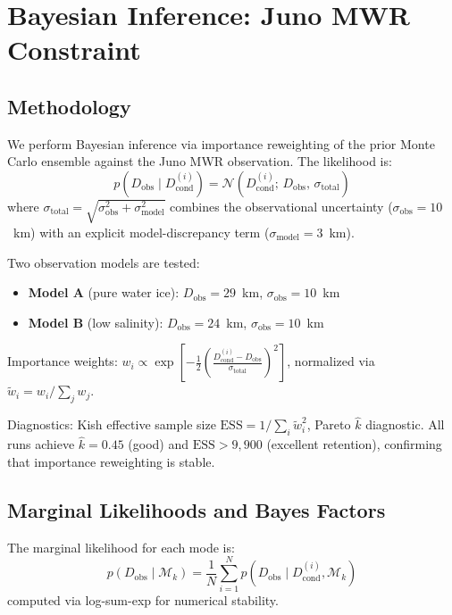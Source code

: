 \documentclass[11pt,letterpaper]{article}
\begin{document}
\section{Bayesian Inference: Juno MWR Constraint}
\label{sec:bayesian}

\subsection{Methodology}

We perform Bayesian inference via importance reweighting of the prior Monte Carlo ensemble against the Juno MWR observation. The likelihood is:
\begin{equation}
  p(D_\mathrm{obs} \mid D_\mathrm{cond}^{(i)}) = \mathcal{N}\!\left(D_\mathrm{cond}^{(i)};\, D_\mathrm{obs},\, \sigma_\mathrm{total}\right)
  \label{eq:likelihood}
\end{equation}
where $\sigma_\mathrm{total} = \sqrt{\sigma_\mathrm{obs}^2 + \sigma_\mathrm{model}^2}$ combines the observational uncertainty ($\sigma_\mathrm{obs} = 10$~km) with an explicit model-discrepancy term ($\sigma_\mathrm{model} = 3$~km).

Two observation models are tested:
\begin{itemize}[nosep]
  \item \textbf{Model A} (pure water ice): $D_\mathrm{obs} = 29$~km, $\sigma_\mathrm{obs} = 10$~km
  \item \textbf{Model B} (low salinity): $D_\mathrm{obs} = 24$~km, $\sigma_\mathrm{obs} = 10$~km
\end{itemize}

Importance weights: $w_i \propto \exp\!\left[-\frac{1}{2}\left(\frac{D_\mathrm{cond}^{(i)} - D_\mathrm{obs}}{\sigma_\mathrm{total}}\right)^2\right]$, normalized via $\tilde{w}_i = w_i / \sum_j w_j$.

Diagnostics: Kish effective sample size $\mathrm{ESS} = 1/\sum_i \tilde{w}_i^2$, Pareto $\hat{k}$ diagnostic. All runs achieve $\hat{k} = 0.45$ (good) and $\mathrm{ESS} > 9{,}900$ (excellent retention), confirming that importance reweighting is stable.

\subsection{Marginal Likelihoods and Bayes Factors}

The marginal likelihood for each mode is:
\begin{equation}
  p(D_\mathrm{obs} \mid \mathcal{M}_k) = \frac{1}{N}\sum_{i=1}^{N} p(D_\mathrm{obs} \mid D_\mathrm{cond}^{(i)}, \mathcal{M}_k)
\end{equation}
computed via log-sum-exp for numerical stability.
\end{document}
